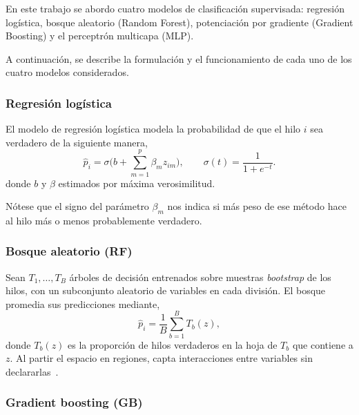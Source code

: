 \documentclass[11pt,a4paper]{article}
\begin{document}
En este trabajo se abordo cuatro modelos de clasificación supervisada: regresión logística, bosque aleatorio (Random Forest), potenciación por gradiente (Gradient Boosting) y el perceptrón multicapa (MLP).


A continuación, se describe la formulación y el funcionamiento de cada uno de los cuatro modelos considerados. 

\subsubsection{Regresión logística}

El modelo de regresión logística modela la probabilidad de que el hilo $i$ sea verdadero de la siguiente manera, 
\[
    \widehat{p}_i=\sigma\Big(b+\sum_{m=1}^{p}\beta_m z_{im}\Big),
  \qquad \sigma(t)=\frac{1}{1+e^{-t}}.
\]
donde $b$ y $\beta$ estimados por m\'axima verosimilitud. 

Nótese que el signo del parámetro $\beta_m$ nos indica si más peso de ese método hace al hilo más o menos probablemente verdadero.

\subsubsection{Bosque aleatorio (RF)}

Sean $T_1,\dots,T_B$ \'arboles de decisi\'on
entrenados sobre muestras \textit{bootstrap} de los hilos, con un subconjunto aleatorio de
variables en cada divisi\'on. El bosque promedia sus predicciones mediante, 
\[
    \widehat{p}_i=\frac{1}{B}\sum_{b=1}^{B}T_b(z),
\]
donde $T_b(z)$ es la proporci\'on de hilos verdaderos en la hoja de $T_b$ que contiene a $z$.
Al partir el espacio en regiones, capta interacciones entre variables sin declararlas~\cite{breiman2001}.

\subsubsection{Gradient boosting (GB)}
\end{document}

